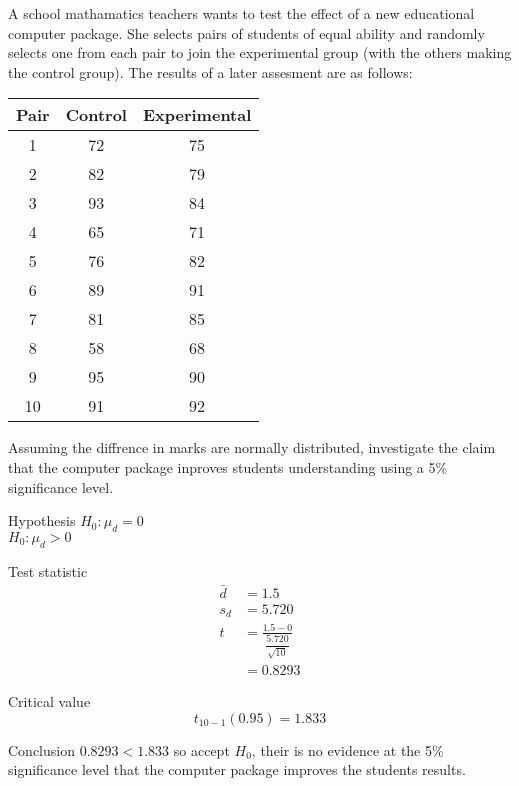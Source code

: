         \begin{example}
        {
            A school mathamatics teachers wants to test the effect of a new educational computer package. She selects pairs of students of equal ability and randomly selects one from each pair to join the experimental group (with the others making the control group). The results of a later assesment are as follows:

            \begin{center}
            \begin{tabular}{c|c|c}
            Pair & Control & Experimental \\
            \hline
            1  & 72 & 75 \\
            2  & 82 & 79 \\
            3  & 93 & 84 \\
            4  & 65 & 71 \\
            5  & 76 & 82 \\
            6  & 89 & 91 \\
            7  & 81 & 85 \\
            8  & 58 & 68 \\
            9  & 95 & 90 \\
            10 & 91 & 92 \\
            \end{tabular}
            \end{center}

            Assuming the diffrence in marks are normally distributed, investigate the claim that the computer package inproves students understanding using a 5\% significance level.
        }

        \begin{step}{Hypothesis}
        $H_0: \mu_d = 0$\\
        $H_0: \mu_d > 0$
        \end{step}

        \begin{step}{Test statistic}
        \begin{align*}
        \bar{d} &= 1.5\\
        s_d &= 5.720\\
        t &= \frac{1.5 - 0}{\dfrac{5.720}{\sqrt{10}}}\\
        &= 0.8293
        \end{align*}
        \end{step}

        \begin{step}{Critical value}
        $$t_{10 - 1}(0.95) = 1.833$$
        \end{step}

        \begin{step}{Conclusion}
        $0.8293 < 1.833$ so accept $H_0$, their is no evidence at the 5\% significance level that the computer package improves the students results.
        \end{step}

        \end{example}

